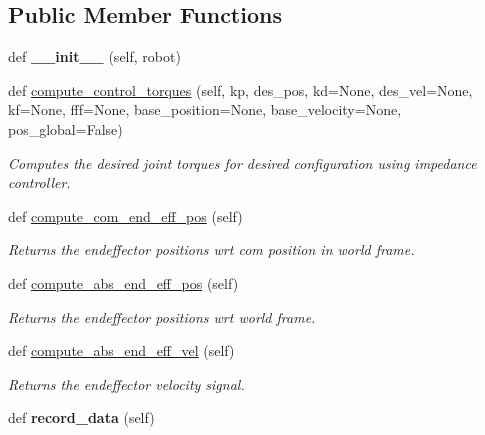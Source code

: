 \subsection*{Public Member Functions}
\begin{DoxyCompactItemize}
\item 
def {\bfseries \+\_\+\+\_\+init\+\_\+\+\_\+} (self, robot)\hypertarget{classpython_1_1dg__tools_1_1leg__impedance__control_1_1solo12__impedance__controller_1_1Solo12ImpedanceController_ad976e804c2d37f15fae274ff6647fb1d}{}\label{classpython_1_1dg__tools_1_1leg__impedance__control_1_1solo12__impedance__controller_1_1Solo12ImpedanceController_ad976e804c2d37f15fae274ff6647fb1d}

\item 
def \hyperlink{classpython_1_1dg__tools_1_1leg__impedance__control_1_1solo12__impedance__controller_1_1Solo12ImpedanceController_a017fe788183d6d226ac80c5857633158}{compute\+\_\+control\+\_\+torques} (self, kp, des\+\_\+pos, kd=None, des\+\_\+vel=None, kf=None, fff=None, base\+\_\+position=None, base\+\_\+velocity=None, pos\+\_\+global=False)
\begin{DoxyCompactList}\small\item\em Computes the desired joint torques for desired configuration using impedance controller. \end{DoxyCompactList}\item 
def \hyperlink{classpython_1_1dg__tools_1_1leg__impedance__control_1_1solo12__impedance__controller_1_1Solo12ImpedanceController_ac3f58073543cac89ec91bccb0e4ab680}{compute\+\_\+com\+\_\+end\+\_\+eff\+\_\+pos} (self)
\begin{DoxyCompactList}\small\item\em Returns the endeffector positions wrt com position in world frame. \end{DoxyCompactList}\item 
def \hyperlink{classpython_1_1dg__tools_1_1leg__impedance__control_1_1solo12__impedance__controller_1_1Solo12ImpedanceController_a4c2e260a3a8750f9490763a74d139788}{compute\+\_\+abs\+\_\+end\+\_\+eff\+\_\+pos} (self)
\begin{DoxyCompactList}\small\item\em Returns the endeffector positions wrt world frame. \end{DoxyCompactList}\item 
def \hyperlink{classpython_1_1dg__tools_1_1leg__impedance__control_1_1solo12__impedance__controller_1_1Solo12ImpedanceController_aeac195c145f446cf632b10e6390c667e}{compute\+\_\+abs\+\_\+end\+\_\+eff\+\_\+vel} (self)
\begin{DoxyCompactList}\small\item\em Returns the endeffector velocity signal. \end{DoxyCompactList}\item 
def {\bfseries record\+\_\+data} (self)\hypertarget{classpython_1_1dg__tools_1_1leg__impedance__control_1_1solo12__impedance__controller_1_1Solo12ImpedanceController_a3ed90b4a3ce54d255263e07f9892bff5}{}\label{classpython_1_1dg__tools_1_1leg__impedance__control_1_1solo12__impedance__controller_1_1Solo12ImpedanceController_a3ed90b4a3ce54d255263e07f9892bff5}

\end{DoxyCompactItemize}
